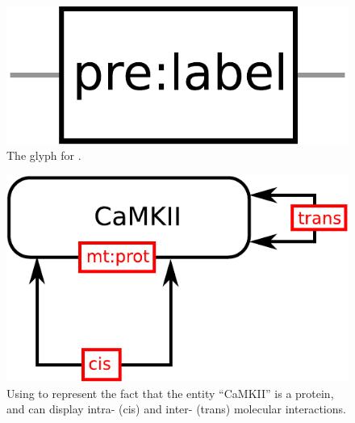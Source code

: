 \begin{figure}[H]
  \centering
  \includegraphics[scale = 0.3]{images/unitInformation}
  \caption{The \ER glyph for .}
  \label{fig:unitInformation}
\end{figure}


\begin{figure}[H]
  \centering
  \includegraphics[scale = 0.5]{examples/ex-unitInformation}
  \caption{Using  to represent the fact that the entity ``CaMKII'' is a protein, and can display intra- (cis) and inter- (trans) molecular interactions.}
  \label{fig:ex-unitInformation}
\end{figure}

